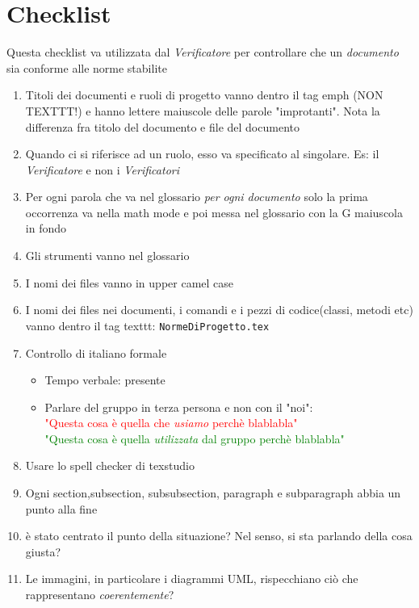 \section{Checklist}
Questa checklist va utilizzata dal \emph{Verificatore} per controllare che un \emph{documento} sia conforme alle norme stabilite

\begin{enumerate}
	\item Titoli dei documenti e ruoli di progetto vanno dentro il tag emph (NON TEXTTT!) e hanno lettere maiuscole delle parole "improtanti". Nota la differenza fra titolo del documento e file del documento
	\item Quando ci si riferisce ad un ruolo, esso va specificato al singolare. Es: il \emph{Verificatore} e non i \emph{Verificatori}
	\item Per ogni parola che va nel glossario \emph{per ogni documento} solo la prima occorrenza va nella math mode e poi messa nel glossario con la G maiuscola in fondo
	\item Gli strumenti vanno nel glossario
	\item I nomi dei files vanno in upper camel case
	\item I nomi dei files nei documenti, i comandi e i pezzi di codice(classi, metodi etc) vanno dentro il tag texttt: \texttt{NormeDiProgetto.tex}
	\item Controllo di italiano formale
	\begin{itemize}
		\item Tempo verbale: presente
		\item Parlare del gruppo in terza persona e non con il "noi":\\ \textcolor{red}{"Questa cosa è quella che \emph{usiamo} perchè blablabla"}\\
		\textcolor{green}{"Questa cosa è quella \emph{utilizzata} dal gruppo perchè blablabla"}
	\end{itemize}
	\item Usare lo spell checker di texstudio
	\item Ogni section,subsection, subsubsection, paragraph e subparagraph abbia un punto alla fine
	\item è stato centrato il punto della situazione? Nel senso, si sta parlando della cosa giusta?
	\item Le immagini, in particolare i diagrammi UML, rispecchiano ciò che rappresentano \emph{coerentemente}?
\end{enumerate}